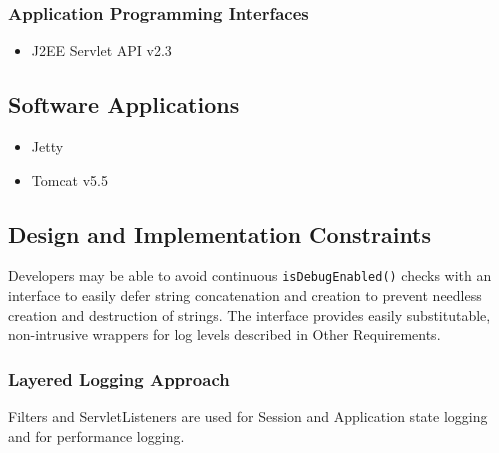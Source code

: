 \documentclass[12pt]{report}
\begin{document}
\subsubsection{Application Programming Interfaces}
\begin{itemize}
  \item J2EE Servlet API v2.3
\end{itemize}

\subsection{Software Applications}
\begin{itemize}
  \item Jetty
  \item Tomcat v5.5
\end{itemize}

\subsection{Design and Implementation Constraints}
Developers may be able to avoid continuous \verb|isDebugEnabled()| checks with an interface to easily defer string
concatenation and creation to prevent needless creation and destruction of strings. The interface provides easily substitutable,
non-intrusive wrappers for log levels described in Other Requirements.

\subsubsection{Layered Logging Approach}
Filters and ServletListeners are used for Session and Application state logging and for performance logging. 
\end{document}
